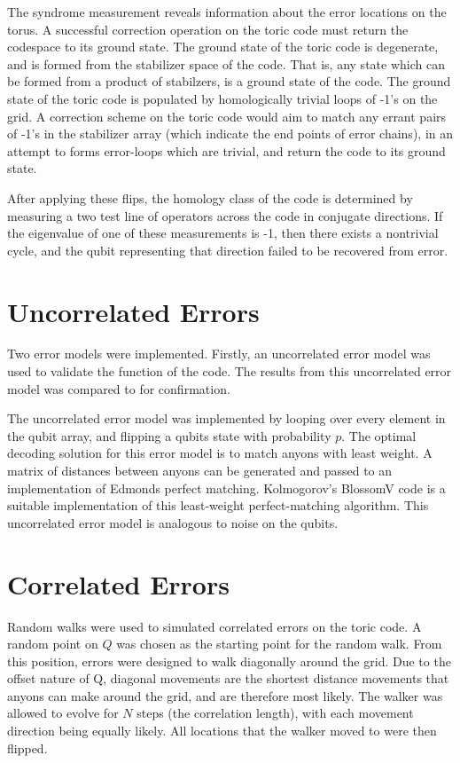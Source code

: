 	The syndrome measurement reveals information about the error locations on the torus. 
	A successful correction operation on the toric code must return the codespace to its ground state. The ground state of the toric code is degenerate, and is formed from the stabilizer space of the code. That is, any state which can be formed from a product of stabilzers, is a ground state of the code. The ground state of the toric code is populated by homologically trivial loops of -1's on the grid. A correction scheme on the toric code would aim to match any errant pairs of -1's in the stabilizer array (which indicate the end points of error chains), in an attempt to forms error-loops which are trivial, and return the code to its ground state.
	
	After applying these flips, the homology class of the code is determined by measuring a two test line of operators across the code in conjugate directions. If the eigenvalue of one of these measurements is -1, then there exists a nontrivial cycle, and the qubit representing that direction failed to be recovered from error. 
	\section{Uncorrelated Errors}
	Two error models were implemented. Firstly, an uncorrelated error model was used to validate the function of the code. The results from this uncorrelated error model was compared to \cite{Stace2010} for confirmation. 
	
	The uncorrelated error model was implemented by looping over every element in the qubit array, and flipping a qubits state with probability $p$. 
	The optimal decoding solution for this error model is to match anyons with least weight. A matrix of distances between anyons can be generated and passed to an implementation of Edmonds perfect matching. Kolmogorov's BlossomV code \cite{Kolmogorov2009} is a suitable implementation of this least-weight perfect-matching algorithm. This uncorrelated error model is analogous to noise on the qubits.

	\section{Correlated Errors}
	Random walks were used to simulated correlated errors on the toric code. 
	A random point on $Q$ was chosen as the starting point for the random walk. From this position, errors were designed to walk diagonally around the grid. Due to the offset nature of Q, diagonal movements are the shortest distance movements that anyons can make around the grid, and are therefore most likely. The walker was allowed to evolve for $N$ steps (the correlation length), with each movement direction being equally likely. 
	All locations that the walker moved to were then flipped.